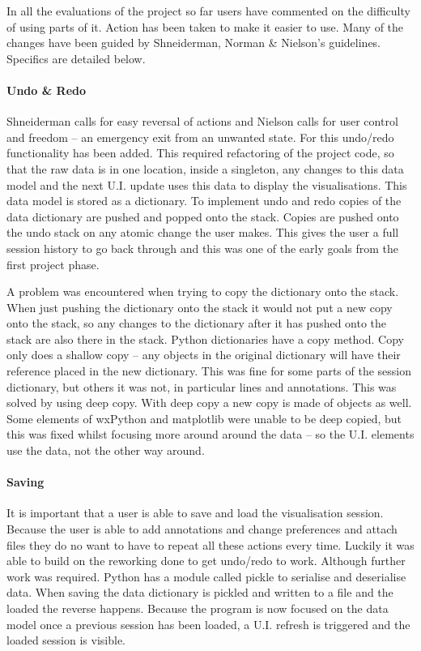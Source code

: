 In all the evaluations of the project so far users have commented on the difficulty of using parts of it.  Action has been taken to make it easier to use.  Many of the changes have been guided by Shneiderman, Norman \& Nielson's guidelines.  Specifics are detailed below.

\paragraph{Undo \& Redo}
Shneiderman calls for easy reversal of actions and Nielson calls for user control and freedom -- an emergency exit from an unwanted state.  For this undo/redo functionality has been added.  This required refactoring of the project code, so that the raw data is in one location, inside a singleton, any changes to this data model and the next U.I. update uses this data to display the visualisations.  This data model is stored as a dictionary.  To implement undo and redo copies of the data dictionary are pushed and popped onto the stack.  Copies are pushed onto the undo stack on any atomic change the user makes.  This gives the user a full session history to go back through and this was one of the early goals from the first project phase.

A problem was encountered when trying to copy the dictionary onto the stack.  When just pushing the dictionary onto the stack it would not put a new copy onto the stack, so any changes to the dictionary after it has pushed onto the stack are also there in the stack.  Python dictionaries have a copy method.  Copy only does a shallow copy -- any objects in the original dictionary will have their reference placed in the new dictionary.  This was fine for some parts of the session dictionary, but others it was not, in particular lines and annotations.  This was solved by using deep copy.  With deep copy a new copy is made of objects as well.  Some elements of wxPython and matplotlib were unable to be deep copied, but this was fixed whilst focusing more around around the data -- so the U.I. elements use the data, not the other way around.

\paragraph{Saving}

It is important that a user is able to save and load the visualisation session.  Because the user is able to add annotations and change preferences and attach files they do no want to have to repeat all these actions every time.  Luckily it was able to build on the reworking done to get undo/redo to work.  Although further work was required. Python has a module called pickle to serialise and deserialise data.  When saving the data dictionary is pickled and written to a file and the loaded the reverse happens.  Because the program is now focused on the data model once a previous session has been loaded, a U.I. refresh is triggered and the loaded session is visible.

